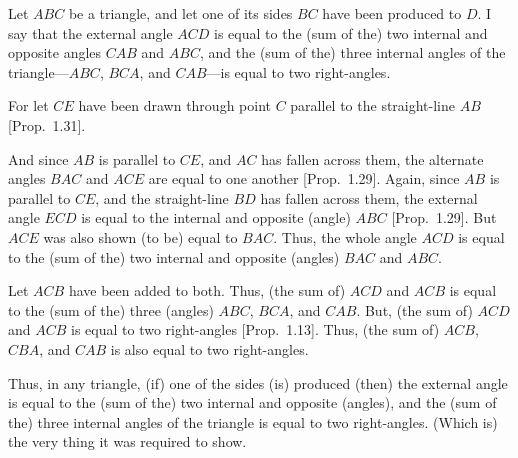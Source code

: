 \begin{Parallel}{}{}
{\epsfysize=2in
\centerline{}

Let $ABC$ be a triangle, and let one of its sides $BC$ have been produced to $D$.
I say that the external angle $ACD$ is equal to the (sum of the) two internal and opposite
angles $CAB$ and $ABC$, and the (sum of the) three internal angles of the triangle---$ABC$, $BCA$, and $CAB$---is equal to two right-angles.

For let $CE$ have been drawn through point $C$ parallel to the straight-line
$AB$ [Prop.~1.31].

And since $AB$ is parallel to $CE$, and $AC$ has fallen across them, the alternate
angles $BAC$ and $ACE$ are equal to one another [Prop.~1.29]. Again,
since $AB$ is parallel to $CE$, and the straight-line $BD$ has fallen across them, 
the external angle $ECD$ is equal to the internal and opposite (angle)
$ABC$ [Prop.~1.29]. But $ACE$ was also shown (to be) equal to $BAC$. Thus, the whole
angle $ACD$ is equal to the (sum of the) two internal and opposite (angles) $BAC$ and $ABC$.

Let $ACB$ have been added to both. Thus, (the sum of) $ACD$ and $ACB$ is equal to
the (sum of the) three (angles) $ABC$, $BCA$, and $CAB$. But, (the sum of) $ACD$ and $ACB$ is equal
to two right-angles [Prop.~1.13]. Thus, (the sum of) $ACB$, $CBA$, and $CAB$ is also
equal to two right-angles.

Thus, in any triangle,  (if) one of the sides  (is) produced (then) the external
angle is equal to the (sum of the) two internal and opposite (angles), and the (sum of the) three
internal angles of the triangle is equal to two right-angles. (Which is)
the very thing it was required to show.}
\end{Parallel}


